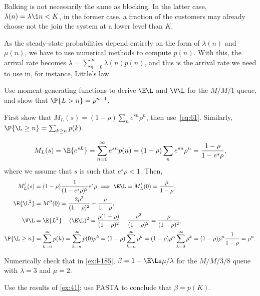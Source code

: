  Balking is not necessarily the same as blocking.
 In the latter case, $\lambda(n)= \lambda \1{n < K}$, in the former case, a fraction of the customers may already choose not the join the system at a lower level than $K$.

 As the steady-state probabilities depend entirely on the form of $\lambda(n)$ and $\mu(n)$, we have to use numerical methods to compute $p(n)$.
 With this, the arrival rate becomes $\lambda = \sum_{n=0}^\infty \lambda(n) p(n)$, and this is the arrival rate we need to use in, for instance, Little's law.



\begin{exercise}\label{ex:34}
Use moment-generating functions to derive $\E\L$ and $\V\L$ for the $M/M/1$ queue, and show that $\P{L>n} = \rho^{n+1}$.
\begin{hint}
First show that $M_L(s) = (1-\rho) \sum_n e^{s n} \rho^n$, then use~\cref{eq:61}.
Similarly, $\P{\L\geq n} = \sum_{k\geq n} p(k)$.
\end{hint}
\begin{solution}
\begin{equation*}
 M_L(s) = \E{e^{s L}} = \sum_{n=0}^\infty e^{s n}p(n) = (1-\rho) \sum_n e^{s n} \rho^n=\frac{1-\rho}{1-e^{s}\rho},
\end{equation*}
where we assume that $s$ is such that $e^s \rho < 1$. Then,
\begin{align*}
 M_L'(s) &= (1-\rho) \frac{1}{(1-e^s\rho)^2} e^s \rho \implies \E\L = M_L'(0)= \frac{\rho}{1-\rho}, \\
 \E{\L^2}&= M''(0)= \frac{2\rho^2}{(1-\rho)^2} + \frac{\rho}{1-\rho},\\
\V\L &= \E{L^2} - (\E\L)^2 = \frac{\rho(1+\rho)}{(1-\rho)^2}-\frac{\rho^2}{(1-\rho)^2} = \frac{\rho}{(1-\rho)^2},\\
 \P{\L\geq n}
 &= \sum_{k=n}^\infty p(k) = \sum_{k=n}^\infty p(0)\rho^k = (1-\rho)\sum_{k=n}^\infty \rho^k
= (1-\rho)\rho^n \sum_{k=0}^\infty\rho^k = (1-\rho) \rho^n \frac1{1-\rho} = \rho^n.
\end{align*}
\end{solution}
\end{exercise}

\begin{exercise}
Numerically check that in \cref{ex:l-185}, $\beta=1-\E\Ls \mu /\lambda$ for the $M/M/3/8$ queue with $\lambda=3$ and $\mu=2$.
\begin{solution}
Use the results of \cref{ex:41}; use PASTA to conclude that $\beta=p(K)$.
\end{solution}
\end{exercise}




